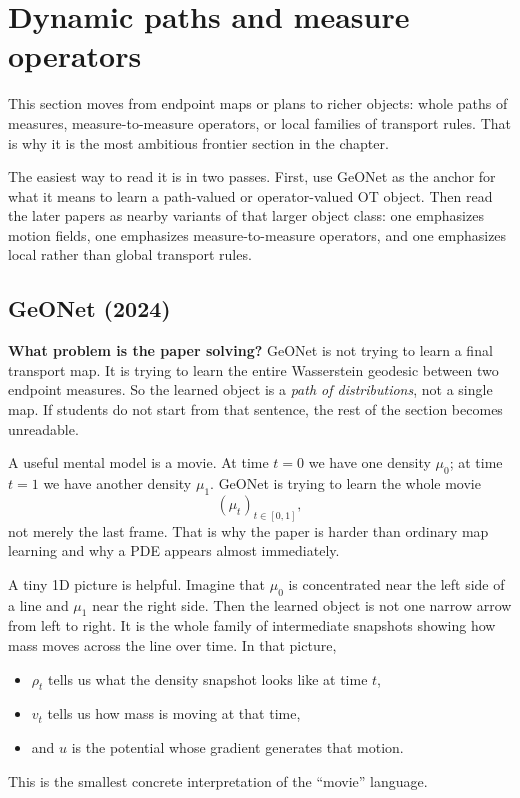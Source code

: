 \documentclass[11pt]{report}
\begin{document}
\section{Dynamic paths and measure operators}

This section moves from endpoint maps or plans to richer objects: whole paths of
measures, measure-to-measure operators, or local families of transport rules.  That
is why it is the most ambitious frontier section in the chapter.

The easiest way to read it is in two passes.  First, use GeONet as the anchor for
what it means to learn a path-valued or operator-valued OT object.  Then read the
later papers as nearby variants of that larger object class: one emphasizes motion
fields, one emphasizes measure-to-measure operators, and one emphasizes local rather
than global transport rules.

\subsection*{GeONet (2024)}

\textbf{What problem is the paper solving?}
GeONet is not trying to learn a final transport map.  It is trying to learn the
entire Wasserstein geodesic between two endpoint measures.  So the learned object
is a \emph{path of distributions}, not a single map.  If students do not start from
that sentence, the rest of the section becomes unreadable.

A useful mental model is a movie.  At time $t=0$ we have one density $\mu_0$; at
time $t=1$ we have another density $\mu_1$.  GeONet is trying to learn the whole
movie
\begin{equation}
(\mu_t)_{t\in[0,1]},
\label{eq:geonet-movie}
\end{equation}
not merely the last frame.  That is why the paper is harder than ordinary map
learning and why a PDE appears almost immediately.

A tiny 1D picture is helpful.  Imagine that $\mu_0$ is concentrated near the left
side of a line and $\mu_1$ near the right side.  Then the learned object is not one
narrow arrow from left to right.  It is the whole family of intermediate snapshots
showing how mass moves across the line over time.  In that picture,
\begin{itemize}
  \item $\rho_t$ tells us what the density snapshot looks like at time $t$,
  \item $v_t$ tells us how mass is moving at that time,
  \item and $u$ is the potential whose gradient generates that motion.
\end{itemize}
This is the smallest concrete interpretation of the ``movie'' language.
\end{document}
